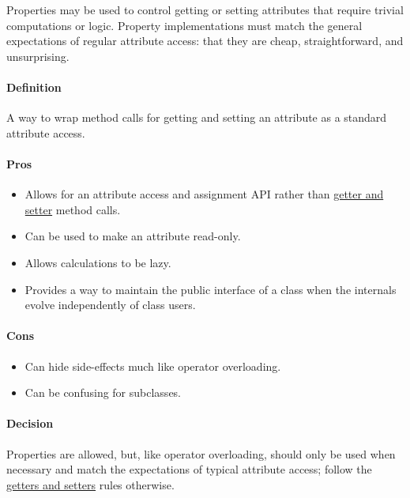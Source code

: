 \documentclass[
]{article}
\providecommand{\tightlist}{%
  \setlength{\itemsep}{0pt}\setlength{\parskip}{0pt}}
\begin{document}
Properties may be used to control getting or setting attributes that
require trivial computations or logic. Property implementations must
match the general expectations of regular attribute access: that they
are cheap, straightforward, and unsurprising.

\paragraph{Definition}

A way to wrap method calls for getting and setting an attribute as a
standard attribute access.

\paragraph{Pros}

\begin{itemize}
\tightlist
\item
  Allows for an attribute access and assignment API rather than
  \hyperref[getters-and-setters]{getter and setter} method calls.
\item
  Can be used to make an attribute read-only.
\item
  Allows calculations to be lazy.
\item
  Provides a way to maintain the public interface of a class when the
  internals evolve independently of class users.
\end{itemize}

\paragraph{Cons}

\begin{itemize}
\tightlist
\item
  Can hide side-effects much like operator overloading.
\item
  Can be confusing for subclasses.
\end{itemize}

\paragraph{Decision}

Properties are allowed, but, like operator overloading, should only be
used when necessary and match the expectations of typical attribute
access; follow the \hyperref[getters-and-setters]{getters and setters}
rules otherwise.
\end{document}
